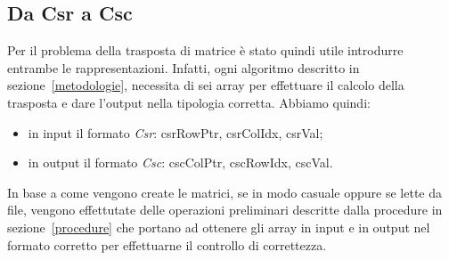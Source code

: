 \subsection{Da Csr a Csc}\label{csr-to-csc}

Per il problema della trasposta di matrice è stato quindi utile introdurre entrambe le rappresentazioni. Infatti, ogni algoritmo  descritto in sezione~\ref{metodologie}, necessita di sei array per effettuare il calcolo della trasposta e dare l'output nella tipologia corretta. Abbiamo quindi:
\begin{itemize}
 \item in input il formato \textit{Csr}: csrRowPtr, csrColIdx, csrVal;
 \item in output il formato \textit{Csc}: cscColPtr, cscRowIdx, cscVal.	
\end{itemize}
In base a come vengono create le matrici, se in modo casuale oppure se lette da file, vengono effettutate delle operazioni preliminari descritte dalla procedure in sezione~\ref{procedure} che portano ad ottenere gli array in input e in output nel formato corretto per effettuarne il controllo di correttezza.